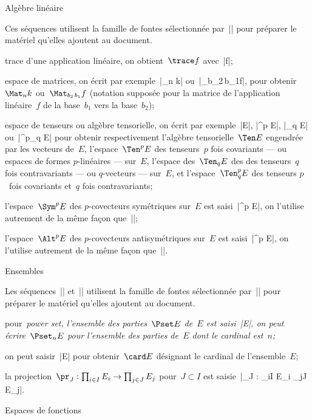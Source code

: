 \formalpar Algèbre linéaire

Ces séquences utilisent la famille de fontes sélectionnée
par~|\tensorsetfont| pour préparer le matériel qu'elles ajoutent au
document.

\begincslist
\item \trace trace d'une application linéaire, on obtient~$\trace f$
      avec~|\trace f|;
\item \Mat espace de matrices, on écrit par exemple~|\Mat_n k|
      ou~|\Mat_{b_2\,b_1}f|, pour
      obtenir $\Mat_n k$ ou~$\Mat_{b_2\,b_1}f$ (notation supposée pour
      la matrice de l'application linéaire~$f$ de la base~$b_1$ vers
      la base~$b_2$);
\item \Ten espace de tenseurs ou algèbre tensorielle, on écrit par
      exemple~|\Ten E|, |\Ten^p E|, |\Ten_q E| ou~|\Ten^p_q E| pour
      obtenir respectivement l'algèbre tensorielle~$\Ten E$ engendrée
      par les vecteurs de~$E$, l'espace~$\Ten^p E$ des tenseurs~$p$ fois
      covariants --- ou espaces de formes $p$-linéaires --- sur~$E$,
      l'espace des~$\Ten_q E$ des des tenseurs~$q$ fois contravariants
      --- ou $q$-vecteurs --- sur~$E$, et l'espace~$\Ten^p_q E$ des
      tenseurs $p$~fois covariants et~$q$ fois contravariants;
\item \Sym l'espace~$\Sym^p E$ des $p$-covecteurs symétriques
      sur~$E$ est saisi~|\Sym^p E|, on l'utilise autrement de la même
      façon que~|\Ten|;
\item \Alt l'espace~$\Alt^p E$ des $p$-covecteurs antisymétriques
      sur~$E$ est saisi~|\Alt^p E|, on l'utilise autrement de la même
      façon que~|\Ten|.
\endcslist


\formalpar Ensembles

Les séquences~|\card| et~|\pr| utilisent la famille de fontes
sélectionnée par~|\categoricfont| pour préparer le matériel qu'elles
ajoutent au document.
\begincslist
\item \Pset pour~\em{power set}, l'ensemble des parties~$\Pset E$
      de~$E$ est saisi~|\Pset E|, on peut écrire~$\Pset_n E$ pour
      l'ensemble des parties de~$E$ dont le cardinal est~$n$;
\item \card on peut saisir~|\card E| pour obtenir~$\card E$ désignant
      le cardinal de l'ensemble~$E$;
\item \pr la projection~$\pr_J : \prod_{i\in I} E_i \to \prod_{j\in J}
      E_j$ pour~$J\subset I$ est
      saisie~|\pr_J : \prod_{i\in I} E_i \to \prod_{j\in J} E_j|.
\endcslist

\formalpar Espaces de fonctions

